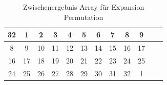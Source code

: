 \begin{table}[h]
    \centering
    \begin{tabular}{|*{12}{c|}}
        \hline
        \cellcolor{green-1}32 &
        \cellcolor{red-1}1 & \cellcolor{red-1}2 & \cellcolor{red-1}3 & \cellcolor{red-1}4 & 
        \cellcolor{red-1}5 & \cellcolor{red-1}6 & \cellcolor{red-1}7 & \cellcolor{red-1}8 & \cellcolor{orange-1}9\\
        \hline 
        \cellcolor{red-1}8 &
        \cellcolor{orange-1}9 & \cellcolor{orange-1}10 & \cellcolor{orange-1}11 & \cellcolor{orange-1}12 & 
        \cellcolor{orange-1}13 & \cellcolor{orange-1}14 & \cellcolor{orange-1}15 & \cellcolor{orange-1}16 & \cellcolor{yellow-1}17 \\
        \hline 
        \cellcolor{orange-1}16 &
        \cellcolor{yellow-1}17 & \cellcolor{yellow-1}18 & \cellcolor{yellow-1}19 & \cellcolor{yellow-1}20 & 
        \cellcolor{yellow-1}21 & \cellcolor{yellow-1}22 & \cellcolor{yellow-1}23 & \cellcolor{yellow-1}24 & \cellcolor{green-1}25\\
        \hline
        \cellcolor{yellow-1}24 &
        \cellcolor{green-1}25 & \cellcolor{green-1}26 & \cellcolor{green-1}27 & \cellcolor{green-1}28 &
        \cellcolor{green-1}29 & \cellcolor{green-1}30 & \cellcolor{green-1}31 & \cellcolor{green-1}32 & \cellcolor{red-1}1\\
        \hline 
    \end{tabular}
    \caption{Zwischenergebnis Array für Expansion Permutation}
\end{table}

